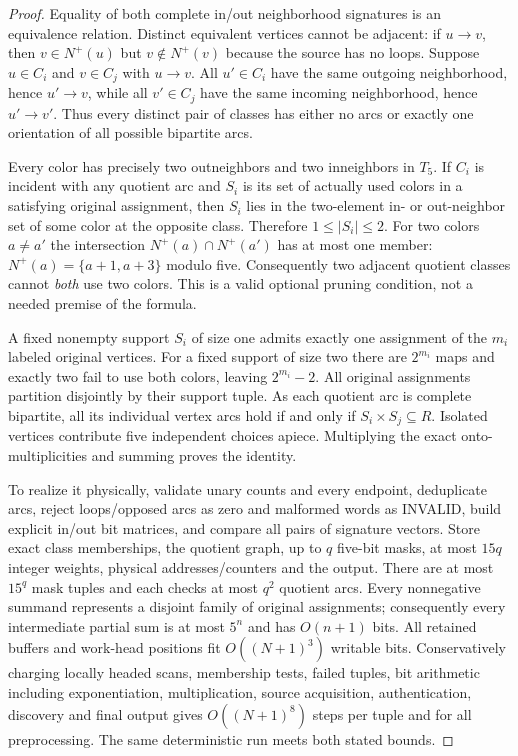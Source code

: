 \documentclass[11pt]{article}
\begin{document}
\begin{proof}
Equality of both complete in/out neighborhood signatures is
an equivalence relation. Distinct equivalent vertices cannot
be adjacent: if $u\to v$, then $v\in N^+(u)$ but
$v\notin N^+(v)$ because the source has no loops.
Suppose $u\in C_i$ and $v\in C_j$ with $u\to v$.
All $u'\in C_i$ have the same outgoing neighborhood, hence
$u'\to v$, while all $v'\in C_j$ have the same incoming
neighborhood, hence $u'\to v'$. Thus every distinct
pair of classes has either no arcs or exactly one orientation of
all possible bipartite arcs.

Every color has precisely two outneighbors and two inneighbors in
$T_5$. If $C_i$ is incident with any quotient arc and
$S_i$ is its set of actually used colors in a satisfying original
assignment, then $S_i$ lies in the two-element
in- or out-neighbor set of some color at the opposite class.
Therefore $1\le |S_i|\le2$.
For two colors $a\ne a'$ the intersection
$N^+(a)\cap N^+(a')$ has at most one member:
$N^+(a)=\{a+1,a+3\}$ modulo five.
Consequently two adjacent quotient classes cannot
\emph{both} use two colors. This is a valid optional pruning
condition, not a needed premise of the formula.

A fixed nonempty support $S_i$ of size one admits exactly one
assignment of the $m_i$ labeled original vertices.
For a fixed support of size two there are $2^{m_i}$ maps
and exactly two fail to use both colors, leaving $2^{m_i}-2$.
All original assignments partition disjointly by their support
tuple. As each quotient arc is complete bipartite, all its
individual vertex arcs hold if and only if
$S_i\times S_j\subseteq R$. Isolated vertices contribute
five independent choices apiece. Multiplying the exact
onto-multiplicities and summing proves the identity.

To realize it physically, validate unary counts and every endpoint,
deduplicate arcs, reject loops/opposed arcs as zero and malformed
words as INVALID, build explicit in/out bit matrices, and compare
all pairs of signature vectors. Store exact class memberships,
the quotient graph, up to $q$ five-bit masks, at most $15q$
integer weights, physical addresses/counters and the output.
There are at most $15^q$ mask tuples and each checks at most
$q^2$ quotient arcs. Every nonnegative summand represents
a disjoint family of original assignments; consequently every
intermediate partial sum is at most $5^n$ and has
$O(n+1)$ bits. All retained buffers and work-head positions fit
$O((N+1)^3)$ writable bits. Conservatively charging locally
headed scans, membership tests, failed tuples, bit arithmetic
including exponentiation, multiplication, source acquisition,
authentication, discovery and final output gives
$O((N+1)^8)$ steps per tuple and for all preprocessing.
The same deterministic run meets both stated bounds.
\end{proof}
\end{document}

